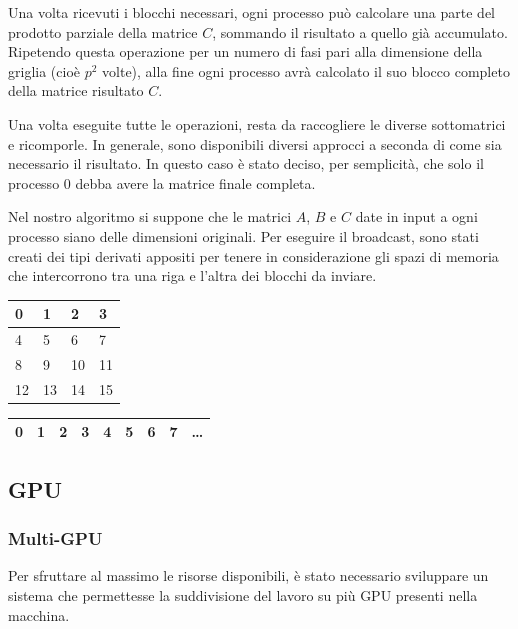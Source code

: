 \documentclass[a4paper]{article}
\begin{document}
Una volta ricevuti i blocchi necessari, ogni processo può calcolare una parte del prodotto parziale della matrice $C$, sommando il risultato a quello già accumulato. Ripetendo questa operazione per un numero di fasi pari alla dimensione della griglia (cioè $p^2$ volte), alla fine ogni processo avrà calcolato il suo blocco completo della matrice risultato $C$.

Una volta eseguite tutte le operazioni, resta da raccogliere le diverse sottomatrici e ricomporle. In generale, sono disponibili diversi approcci a seconda di come sia necessario il risultato. In questo caso è stato deciso, per semplicità, che solo il processo 0 debba avere la matrice finale completa.

Nel nostro algoritmo si suppone che le matrici $A$, $B$ e $C$ date in input a ogni processo siano delle dimensioni originali. Per eseguire il broadcast, sono stati creati dei tipi derivati appositi per tenere in considerazione gli spazi di memoria che intercorrono tra una riga e l'altra dei blocchi da inviare.
\begin{table}[h]
    \center
    \begin{tabular}{|l|l|l|l|}
        \hline
        \cellcolor{yellow}0 & \cellcolor{yellow}1 & 2  & 3  \\ \hline
        \cellcolor{yellow}4 & \cellcolor{yellow}5 & 6  & 7  \\ \hline
        8                   & 9                   & 10 & 11 \\ \hline
        12                  & 13                  & 14 & 15 \\ \hline
    \end{tabular}
    \begin{tabular}{|l|l|l|l|l|l|l|l|l}
        \hline
        \cellcolor{yellow}0 & \cellcolor{yellow}1 & 2 & 3 & \cellcolor{yellow}4 & \cellcolor{yellow}5 & 6 & 7 & \dots \\ \hline
    \end{tabular}
\end{table}

\subsection{GPU}
\subsubsection{Multi-GPU}
Per sfruttare al massimo le risorse disponibili, è stato necessario sviluppare un sistema che permettesse la suddivisione del lavoro su più GPU presenti nella macchina.
\end{document}
